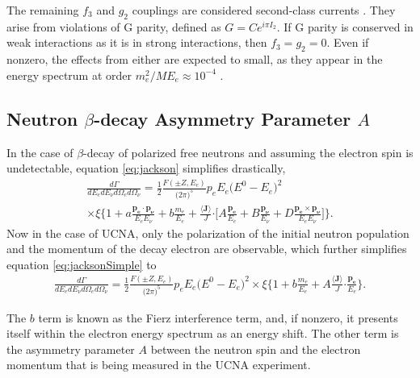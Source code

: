 The remaining $f_3$ and $g_2$ couplings are considered second-class currents \cite{weinberg1958charge}.
They arise from violations of G parity, defined as $G = Ce^{i\pi I_2}$. If G parity is conserved in
weak interactions as it is in strong interactions, then $f_3=g_2=0$. Even if nonzero, the effects
from either are expected to small, as they appear in the energy spectrum at order $m_e^2/ME_e \approx 10^{-4}$
\cite{plaster2012,holstein1974recoil}.


\subsection{Neutron $\beta$-decay Asymmetry Parameter $A$}

In the case of $\beta$-decay of polarized free neutrons and assuming the electron spin is undetectable,
equation \ref{eq:jackson} simplifies drastically,
%
\begin{multline}
  \frac{d\Gamma}{dE_e dE_\nu d\Omega_e d\Omega_\nu} = \frac{1}{2} \frac{F(\pm Z, E_e)}{\big( 2\pi \big)^5}
  p_e E_e \big( E^0 - E_e \big)^2 \\ \times \xi 
  \Bigg\{ 1 + a\frac{\boldsymbol{p_e \cdot p_\nu}}{E_e E_\nu} + b\frac{m_e}{E_e} 
  + \frac{\boldsymbol{\langle J \rangle}}{J} \boldsymbol{\cdot} \Bigg[ A\frac{\boldsymbol{p_e}}{E_e}
    + B\frac{\boldsymbol{p_\nu}}{E_\nu} + D\frac{\boldsymbol{p_e \times p_\nu}}{E_e E_\nu}\Bigg]
  \Bigg\}.
  \label{eq:jacksonSimple}
\end{multline}
%
Now in the case of UCNA, only the polarization of the initial neutron population and the momentum
of the decay electron are observable, which further simplifies equation \ref{eq:jacksonSimple} to
%
\begin{multline}
  \frac{d\Gamma}{dE_e dE_\nu d\Omega_e d\Omega_\nu} = \frac{1}{2} \frac{F(\pm Z, E_e)}{\big( 2\pi \big)^5}
  p_e E_e \big( E^0 - E_e \big)^2 \times \xi 
  \Bigg\{ 1 + b\frac{m_e}{E_e} 
  + A \frac{\boldsymbol{\langle J \rangle}}{J} \boldsymbol{\cdot}\frac{\boldsymbol{p_e}}{E_e}
  \Bigg\}.
  \label{eq:jacksonSimple2}
\end{multline}
%

The $b$ term is known as the Fierz interference term, and, if nonzero, it presents itself
within the electron energy spectrum as an energy shift. The other term is the asymmetry parameter
$A$ between the neutron spin and the electron momentum that is being measured in the UCNA experiment.


